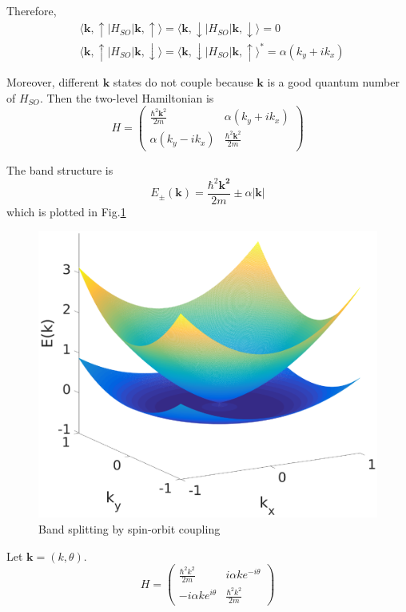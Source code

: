 \documentclass{article}
\begin{document}
Therefore,
\begin{align*}
&\langle\mathbf{k},\uparrow|H_{SO}|\mathbf{k},\uparrow\rangle=\langle\mathbf{k},\downarrow|H_{SO}|\mathbf{k},\downarrow\rangle=0\\
&\langle\mathbf{k},\uparrow|H_{SO}|\mathbf{k},\downarrow\rangle=\langle\mathbf{k},\downarrow|H_{SO}|\mathbf{k},\uparrow\rangle^*=\alpha(k_y+ik_x)
\end{align*}

Moreover, different $\mathbf{k}$ states do not couple because $\mathbf{k}$ is a good quantum number of $H_{SO}$. Then the two-level Hamiltonian is
\begin{equation*}
H=\left(\begin{array}{cc}\frac{\hbar^2\mathbf{k}^2}{2m}&\alpha(k_y+ik_x)\\\alpha(k_y-ik_x)&\frac{\hbar^2\mathbf{k}^2}{2m}\end{array}\right)
\end{equation*}

The band structure is
\begin{equation*}
E_{\pm}(\mathbf{k})=\frac{\hbar^2\mathbf{k^2}}{2m}\pm\alpha|\mathbf{k}|
\end{equation*}
which is plotted in Fig.\ref{bands}
\begin{figure}[!htbp]
	\centering
	\includegraphics[width=12cm]{bands.eps}
	\caption{Band splitting by spin-orbit coupling}\label{bands}
\end{figure}

Let $\mathbf{k}=(k,\theta)$.
\begin{equation*}
H=\left(\begin{array}{cc}\frac{\hbar^2k^2}{2m}&i\alpha ke^{-i\theta}\\-i\alpha ke^{i\theta}&\frac{\hbar^2k^2}{2m}\end{array}\right)
\end{equation*}
\end{document}
